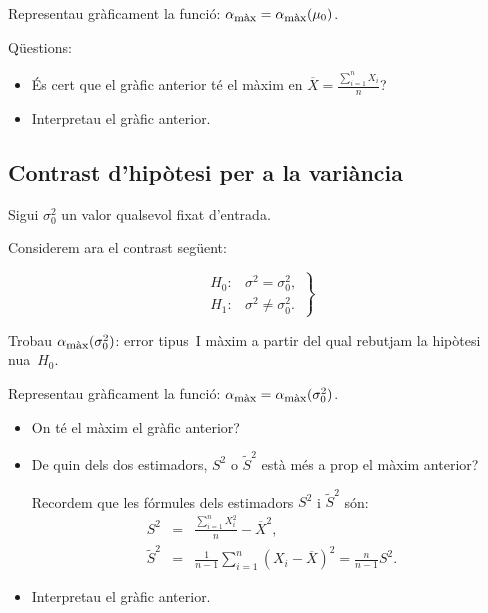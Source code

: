 Representau gr\`aficament la funci\'o: 
$\alpha_{\mbox{\footnotesize m\`ax}}=\alpha_{\mbox{\footnotesize m\`ax}}(\mu_0)$.

Q\"uestions:
\begin{itemize}
\item \'Es cert que el gr\`afic anterior t\'e el m\`axim 
en $\overline{X}= \frac{\sum\limits_{i=1}^n X_i}{n}$?

\item Interpretau el gr\`afic anterior.
\end{itemize}

\subsection{Contrast d'hip\`otesi per a la vari\`ancia
}

Sigui $\sigma_0^2$ un valor qualsevol fixat d'entrada.

Considerem ara el contrast seg\"uent:

\[
\left.
\begin{array}{ll}
H_0:&\sigma^2 =\sigma_0^2, \\
H_1:&\sigma^2\not =\sigma_0^2.
\end{array}
\right\}
\]

Trobau $\alpha_{\mbox{\footnotesize m\`ax}}(\sigma_0^2)$: error tipus~I 
m\`axim a partir del qual rebutjam la hip\`otesi nu{\lgem}a~$H_0$.

Representau gr\`aficament la funci\'o: 
$\alpha_{\mbox{\footnotesize m\`ax}}=\alpha_{\mbox{\footnotesize m\`ax}}(\sigma_0^2)$.

\begin{itemize}
\item On t\'e el m\`axim el gr\`afic anterior?

\item De quin dels dos estimadors, $S^2$ o $\tilde{S}^2$ est\`a m\'es 
a prop el m\`axim anterior?

Recordem que les f\'ormules dels estimadors 
$S^2$ i $\tilde{S}^2$ s\'on:
\begin{eqnarray*}
S^2 & = & \frac{\sum\limits_{i=1}^n X_i^2}{n}-\overline{X}^2, \\
\tilde{S}^2 & = & \frac{1}{n-1}\sum_{i=1}^n {(X_i-\overline{X})}^2 = 
\frac{n}{n-1} S^2.
\end{eqnarray*}

\item Interpretau el gr\`afic anterior.
\end{itemize}

